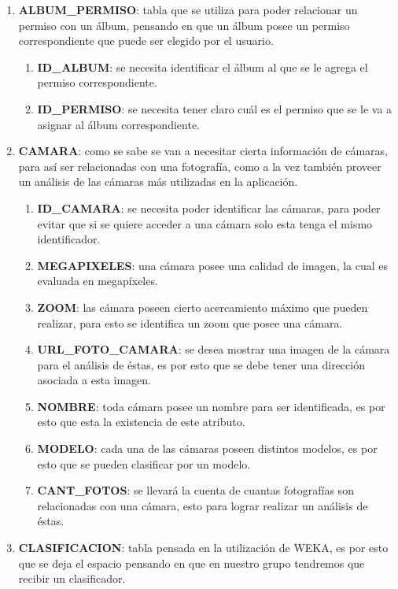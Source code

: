 \documentclass{memoria}
\begin{document}
\begin{enumerate}
\item \textbf{ALBUM\_PERMISO}: tabla que se utiliza para poder relacionar un permiso con un álbum, pensando en que un álbum posee un permiso correspondiente que puede ser elegido por el usuario.

	\begin{enumerate}
	\item \textbf{ID\_ALBUM}: se necesita identificar el álbum al que se le agrega el permiso correspondiente.
	\item \textbf{ID\_PERMISO}: se necesita tener claro cuál es el permiso que se le va a asignar al álbum correspondiente.
	\end{enumerate}
	
\item \textbf{CAMARA}: como se sabe se van a necesitar cierta información de cámaras, para así ser relacionadas con una fotografía, como a la vez también proveer un análisis de las cámaras más utilizadas en la aplicación. 

	\begin{enumerate}
	\item \textbf{ID\_CAMARA}: se necesita poder identificar las cámaras, para poder evitar que si se quiere acceder a una cámara solo esta tenga el mismo identificador.
	\item \textbf{MEGAPIXELES}: una cámara posee una calidad de imagen, la cual es evaluada en megapíxeles.
	\item \textbf{ZOOM}: las cámara poseen cierto acercamiento máximo que pueden realizar, para esto se identifica un zoom que posee una cámara.
	\item \textbf{URL\_FOTO\_CAMARA}: se desea mostrar una imagen de la cámara para el análisis de éstas, es por esto que se debe tener una dirección asociada a esta imagen.
	\item \textbf{NOMBRE}: toda cámara posee un nombre para ser identificada, es por esto que esta la existencia de este atributo.
	\item \textbf{MODELO}: cada una de las cámaras poseen distintos modelos, es por esto que se pueden clasificar por un modelo.
	\item \textbf{CANT\_FOTOS}: se llevará la cuenta de cuantas fotografías son relacionadas con una cámara, esto para lograr realizar un análisis de éstas.
	\end{enumerate}
	
\item \textbf{CLASIFICACION}: tabla pensada en la utilización de WEKA, es por esto que se deja el espacio pensando en que en nuestro grupo tendremos que recibir un clasificador.


\end{enumerate}
\end{document}
